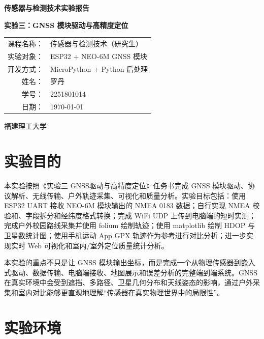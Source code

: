 \documentclass[UTF8,a4paper,12pt]{ctexart}
\begin{document}
\begin{titlepage}
\centering
\vspace*{2.2cm}
{\bfseries 传感器与检测技术实验报告\par}
\vspace{1.2cm}
{\bfseries 实验三：GNSS 模块驱动与高精度定位\par}
\vspace{2.2cm}
\begin{tabular}{rl}
课程名称：& 传感器与检测技术（研究生）\\[0.6cm]
实验对象：& ESP32 + NEO-6M GNSS 模块\\[0.6cm]
开发方式：& MicroPython + Python 后处理\\[0.6cm]
姓名：& 罗丹\\[0.6cm]
学号：& 2251801014\\[0.6cm]
日期：& \today\\
\end{tabular}
\vfill
{福建理工大学\par}
\end{titlepage}

\tableofcontents
\clearpage

\section{实验目的}
本实验按照《实验三 GNSS驱动与高精度定位》任务书完成 GNSS 模块驱动、协议解析、无线传输、户外轨迹采集、可视化和质量分析。实验目标包括：使用 ESP32 UART 接收 NEO-6M 模块输出的 NMEA 0183 数据；自行实现 NMEA 校验和、字段拆分和经纬度格式转换；完成 WiFi UDP 上传到电脑端的短时实测；完成户外校园路线采集并使用 folium 绘制轨迹；使用 matplotlib 绘制 HDOP 与卫星数统计图；使用手机运动 App GPX 轨迹作为参考进行对比分析；进一步实现实时 Web 可视化和室内/室外定位质量统计分析。

本实验的重点不只是让 GNSS 模块输出坐标，而是完成一个从物理传感器到嵌入式驱动、数据传输、电脑端接收、地图展示和误差分析的完整端到端系统。GNSS 在真实环境中会受到遮挡、多路径、卫星几何分布和天线姿态的影响，通过户外采集和室内对比能够更直观地理解“传感器在真实物理世界中的局限性”。

\section{实验环境}
\end{document}
